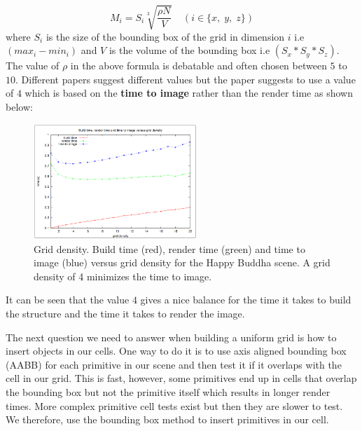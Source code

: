 \documentclass[11pt,a4paper]{article}
\begin{document}
\begin{equation}
M_{i} = S_{i} \sqrt[3]{\frac{\rho N}{V}}\;\;\;\; (i \in \{x,\;y,\;z\})
\end{equation}
where $S_{i}$ is the size of the bounding box of the grid in dimension $i$ i.e $(max_{i} - min_{i})$ and $V$ is the volume of the bounding box i.e $(S_{x} * S_{y} * S_{z})$.  The value of $\rho$ in the above formula is debatable and often chosen between $5$ to $10$. Different papers suggest different values but the paper \cite{lagae2008compact} suggests to use a value of $4$ which is based on the \textbf{time to image} rather than the render time as shown below:
\begin{figure}[H]
	\centering
	\captionsetup{justification=centering,margin=2cm}
	\includegraphics[width=0.55\textwidth]{grid_density_graph}
	\caption{Grid density. Build time (red), render time (green) and
time to image (blue) versus grid density for the Happy Buddha
scene. A grid density of 4 minimizes the time to image. \protect\cite{lagae2008compact}}
\end{figure}
It can be seen that the value $4$ gives a nice balance for the time it takes to build the structure and the time it takes to render the image.
\\
\noindent

The next question we need to answer when building a uniform grid is how to insert objects in our cells. One way to do it is to use axis aligned bounding box (AABB) for each primitive in our scene and then test it if it overlaps with the cell in our grid. This is fast, however, some primitives end up in cells that overlap the bounding box but not the primitive itself which results in longer render times. More complex primitive cell tests exist but then they are slower to test. We therefore, use the bounding box method to insert primitives in our cell.
\\
\noindent
\end{document}

